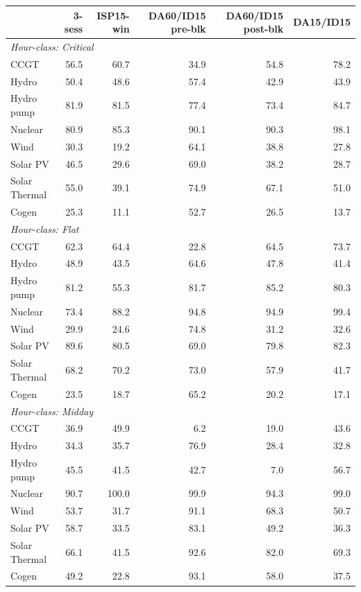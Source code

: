 \begin{tabular}{l r r r r r}
\toprule
 & 3-sess & ISP15-win & DA60/ID15 pre-blk & DA60/ID15 post-blk & DA15/ID15 \\
\midrule
\multicolumn{6}{l}{\textit{Hour-class: Critical}} \\
CCGT & 56.5 & 60.7 & 34.9 & 54.8 & 78.2 \\
Hydro & 50.4 & 48.6 & 57.4 & 42.9 & 43.9 \\
Hydro pump & 81.9 & 81.5 & 77.4 & 73.4 & 84.7 \\
Nuclear & 80.9 & 85.3 & 90.1 & 90.3 & 98.1 \\
Wind & 30.3 & 19.2 & 64.1 & 38.8 & 27.8 \\
Solar PV & 46.5 & 29.6 & 69.0 & 38.2 & 28.7 \\
Solar Thermal & 55.0 & 39.1 & 74.9 & 67.1 & 51.0 \\
Cogen & 25.3 & 11.1 & 52.7 & 26.5 & 13.7 \\
\midrule
\multicolumn{6}{l}{\textit{Hour-class: Flat}} \\
CCGT & 62.3 & 64.4 & 22.8 & 64.5 & 73.7 \\
Hydro & 48.9 & 43.5 & 64.6 & 47.8 & 41.4 \\
Hydro pump & 81.2 & 55.3 & 81.7 & 85.2 & 80.3 \\
Nuclear & 73.4 & 88.2 & 94.8 & 94.9 & 99.4 \\
Wind & 29.9 & 24.6 & 74.8 & 31.2 & 32.6 \\
Solar PV & 89.6 & 80.5 & 69.0 & 79.8 & 82.3 \\
Solar Thermal & 68.2 & 70.2 & 73.0 & 57.9 & 41.7 \\
Cogen & 23.5 & 18.7 & 65.2 & 20.2 & 17.1 \\
\midrule
\multicolumn{6}{l}{\textit{Hour-class: Midday}} \\
CCGT & 36.9 & 49.9 & 6.2 & 19.0 & 43.6 \\
Hydro & 34.3 & 35.7 & 76.9 & 28.4 & 32.8 \\
Hydro pump & 45.5 & 41.5 & 42.7 & 7.0 & 56.7 \\
Nuclear & 90.7 & 100.0 & 99.9 & 94.3 & 99.0 \\
Wind & 53.7 & 31.7 & 91.1 & 68.3 & 50.7 \\
Solar PV & 58.7 & 33.5 & 83.1 & 49.2 & 36.3 \\
Solar Thermal & 66.1 & 41.5 & 92.6 & 82.0 & 69.3 \\
Cogen & 49.2 & 22.8 & 93.1 & 58.0 & 37.5 \\
\midrule
\bottomrule
\end{tabular}
